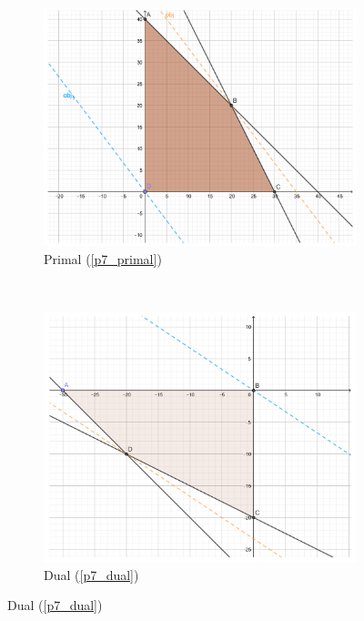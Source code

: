 \documentclass[12pt]{article}
\begin{document}
\begin{figure}[htbp]
    \centering
    \begin{subfigure}[b]{0.5\textwidth}
        \includegraphics[width=\textwidth]{p7_primal.pdf}
        \caption{Primal (\ref{p7_primal})}
        \label{fig_primal}
    \end{subfigure}
    ~ %
    \begin{subfigure}[b]{0.5\textwidth}
        \includegraphics[width=\textwidth]{p7_dual.pdf}
        \caption{Dual (\ref{p7_dual})}
        \label{fig_dual}
    \end{subfigure}

\end{figure}
\end{document}
